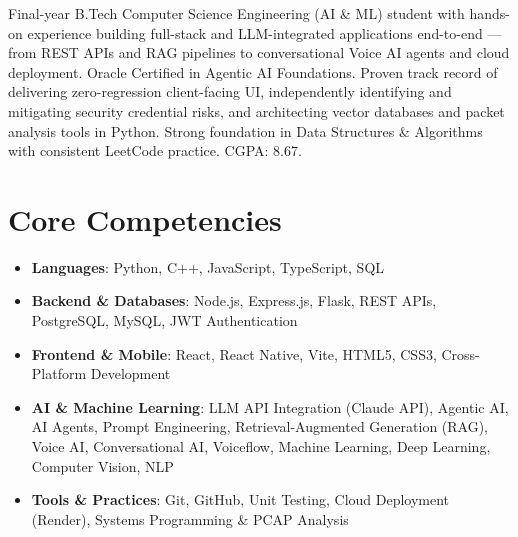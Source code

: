 \documentclass[11pt,a4paper,sans]{moderncv}
\begin{document}
\makecvtitle


\vspace{6pt}
\small{Final-year B.Tech Computer Science Engineering (AI \& ML) student with hands-on experience building full-stack and LLM-integrated applications end-to-end --- from REST APIs and RAG pipelines to conversational Voice AI agents and cloud deployment. Oracle Certified in Agentic AI Foundations. Proven track record of delivering zero-regression client-facing UI, independently identifying and mitigating security credential risks, and architecting vector databases and packet analysis tools in Python. Strong foundation in Data Structures \& Algorithms with consistent LeetCode practice. CGPA: 8.67.}


\section{Core Competencies}
\vspace{1pt}
\begin{itemize}

\item \textbf{Languages}: Python, C++, JavaScript, TypeScript, SQL

\item \textbf{Backend \& Databases}: Node.js, Express.js, Flask, REST APIs, PostgreSQL, MySQL, JWT Authentication

\item \textbf{Frontend \& Mobile}: React, React Native, Vite, HTML5, CSS3, Cross-Platform Development

\item \textbf{AI \& Machine Learning}: LLM API Integration (Claude API), Agentic AI, AI Agents, Prompt Engineering, Retrieval-Augmented Generation (RAG), Voice AI, Conversational AI, Voiceflow, Machine Learning, Deep Learning, Computer Vision, NLP

\item \textbf{Tools \& Practices}: Git, GitHub, Unit Testing, Cloud Deployment (Render), Systems Programming \& PCAP Analysis

\end{itemize}
\end{document}
